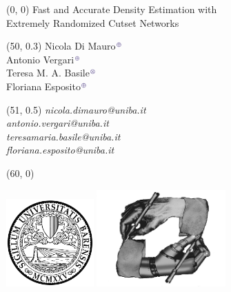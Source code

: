 \documentclass[final]{beamer}
\newcommand{\summark}{\tiny\textcolor{lacamlilac}{$\boldsymbol{\oplus}$}}
\newcommand{\prodmark}{\tiny\textcolor{lacamlilac}{$\boldsymbol{\otimes}$}}
\begin{document}
\begin{frame}{}
  \begin{textblock}{78}(0, 0)
    \Huge
    Fast and Accurate Density Estimation with\\
    Extremely Randomized Cutset Networks
  \end{textblock}
  \begin{textblock}{40}(50, 0.3)
    \small
    Nicola {Di Mauro}${}^{\text{\summark}}$\\[10pt]
    Antonio Vergari${}^{\text{\summark}}$\\[10pt]
    Teresa M. A. Basile${}^{\text{\prodmark}}$\\[10pt]
    Floriana Esposito${}^{\text{\summark}}$
  \end{textblock}
  \begin{textblock}{7}(51, 0.5)
    \scriptsize
    \flushright
    \emph{nicola.dimauro@uniba.it}\\[19pt]
    \emph{antonio.vergari@uniba.it}\\[17pt]
    \emph{teresamaria.basile@uniba.it}\\[17pt]
    \emph{floriana.esposito@uniba.it}
  \end{textblock}
    \begin{textblock}{30}(60, 0)
    \scriptsize
    \begin{minipage}[t]{20cm}
      \vspace{0pt}\hspace{15pt}
      \includegraphics[width=95pt]{figures/unibaba}
      \hspace{10pt}
      \vspace{5pt}\includegraphics[width=140pt]{figures/lacam}

\end{minipage}
\end{textblock}
\end{frame}
\end{document}
